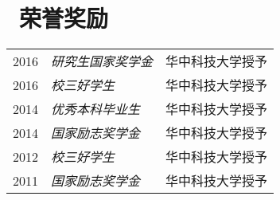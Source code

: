 \documentclass{resume}
\begin{document}
\section{\faSigning\ 荣誉奖励}
\begin{tabular}{rll}
2016 & \textit{研究生国家奖学金} & 华中科技大学授予\\
2016 & \textit{校三好学生} &  华中科技大学授予\\
2014 & 	\textit{优秀本科毕业生} & 华中科技大学授予\\
2014 & 	\textit{国家励志奖学金} &  华中科技大学授予\\
2012 & 	\textit{校三好学生} & 华中科技大学授予\\
2011 & 	\textit{国家励志奖学金} &华中科技大学授予\\
\end{tabular}

\end{document}
